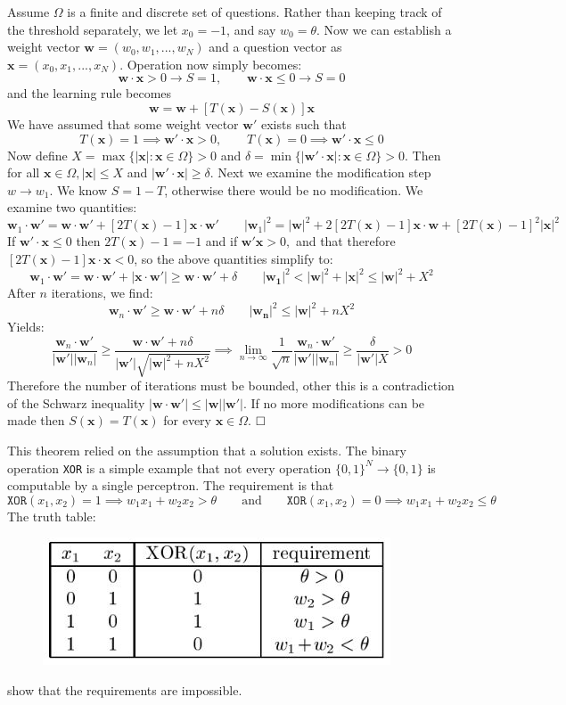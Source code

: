 \documentclass[]{article}
\newcommand{\abs}[1]{\left|#1\right|}
\newcommand{\B}[1]{\boldsymbol{#1}}
\newcommand{\qed}{\hfill\square }
\theoremstyle{plain}
\theoremstyle{definition}
\begin{document}
Assume $ \Omega $ is a finite and discrete set of questions. Rather than keeping track of the threshold separately, we let $ x_0 = -1 $, and say $ w_0 = \theta $. Now we can establish a weight vector $ \B{w} = (w_0, w_1, ..., w_N) $ and a question vector as $ \B{x} = (x_0, x_1, ..., x_N) $. Operation now simply becomes:
\[ \B{w}\cdot \B{x} > 0 \to S = 1,\qquad \B{w}\cdot \B{x} \leq 0 \to S = 0\]
and the learning rule becomes
\[ \B{w} = \B{w} + [T(\B{x}) - S(\B{x})]\B{x} \]
We have assumed that some weight vector $ \B{w}' $ exists such that 
\[T(\B{x}) = 1\implies\B{w}'\cdot \B{x} > 0,\qquad T(\B{x}) = 0\implies\B{w}'\cdot \B{x} \leq 0\]
Now define $ X = \max\{\abs{\B{x}}:\B{x}\in\Omega\} > 0 $ and $ \delta = \min\{\abs{\B{w}'\cdot\B{x}}:\B{x}\in\Omega\} > 0 $. Then for all $ \B{x}\in\Omega,  \abs{\B{x}}\leq X $ and $ \abs{\B{w}'\cdot\B{x}} \geq \delta $. Next we examine the modification step $ w\to w_1 $. We know $ S = 1-T $, otherwise there would be no modification. We examine two quantities:
\[ \B{w}_1\cdot \B{w}' = \B{w}\cdot \B{w}' + [2T(\B{x}) - 1]\B{x}\cdot \B{w}' \qquad 
\abs{\B{w}_1}^2 = \abs{\B{w}}^2 + 2[2T(\B{x}) - 1]\B{x}\cdot\B{w} + [2T(\B{x}) - 1]^2\abs{\B{x}}^2\]
If $ \B{w}'\cdot\B{x} \leq 0 $ then $ 2T(\B{x}) - 1 = -1 $ and if $ \B{w}'\B{x} > 0, $ and that therefore $ [2T(\B{x}) - 1]\B{x}\cdot\B{x}<0 $, so the above quantities simplify to:
\[ \B{w}_1\cdot \B{w}' = \B{w}\cdot \B{w}' + \abs{\B{x}\cdot \B{w}'} \geq \B{w}\cdot\B{w}'+\delta\qquad 
\abs{\B{w_1}}^2 < \abs{\B{w}}^2 + \abs{\B{x}}^2 \leq \abs{\B{w}}^2 + X^2\]
After $ n $ iterations, we find:
\[ \B{w}_n\cdot \B{w}' 
\geq \B{w}\cdot\B{w}'+n\delta\qquad 
\abs{\B{w_n}}^2 \leq \abs{\B{w}}^2 + nX^2\]
Yields:
\[ \frac{\B{w}_n\cdot\B{w}'}{\abs{\B{w}'}\abs{\B{w}_n}} 
\geq
\frac{\B{w}\cdot\B{w}'+n\delta}{\abs{\B{w}'}\sqrt{\abs{\B{w}}^2 + nX^2}}
\implies
\lim\limits_{n\to\infty}\frac{1}{\sqrt{n}}\frac{\B{w}_n\cdot\B{w}'}{\abs{\B{w}'}\abs{\B{w}_n}}
\geq
\frac{\delta}{\abs{\B{w}'}X} > 0
\]
Therefore the number of iterations must be bounded, other this is a contradiction of the Schwarz inequality $ \abs{\B{w}\cdot\B{w}'}\leq \abs{\B{w}}\abs{\B{w}'}$. If no more modifications can be made then $ S(\B{x}) = T(\B{x}) $ for every $ \B{x}\in\Omega $. $ \qed $

This theorem relied on the assumption that a solution exists. The binary operation \texttt{XOR} is a simple example that not every operation $ \{0,1\}^N\to\{0,1\} $ is computable by a single perceptron. The requirement is that
\[ \texttt{XOR}(x_1, x_2) = 1 \implies w_1x_1 + w_2x_2 > \theta
\qquad \text{and}\qquad
\texttt{XOR}(x_1, x_2) = 0 \implies w_1x_1 + w_2x_2 \leq \theta\]
The truth table:
\begin{figure}[h]
\centering
\includegraphics[scale=01]{CoolenXORtable.jpg}
\end{figure}
show that the requirements are impossible. 
\end{document}
